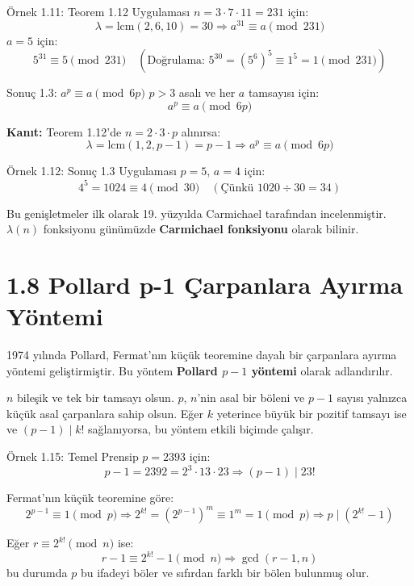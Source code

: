 \documentclass[12pt]{article}
\begin{document}
\begin{examplebox}{Örnek 1.11: Teorem 1.12 Uygulaması}
$n = 3 \cdot 7 \cdot 11 = 231$ için:
\[
\lambda = \text{lcm}(2,6,10) = 30 \Rightarrow a^{31} \equiv a \pmod{231}
\]
$a = 5$ için:
\[
5^{31} \equiv 5 \pmod{231} \quad (\text{Doğrulama: } 5^{30} = (5^6)^5 \equiv 1^5 = 1 \pmod{231})
\]
\end{examplebox}

\begin{theorembox}{Sonuç 1.3: $a^p \equiv a \pmod{6p}$}
$p > 3$ asalı ve her $a$ tamsayısı için:
\[
a^p \equiv a \pmod{6p}
\]

\textbf{Kanıt:} Teorem 1.12'de $n = 2 \cdot 3 \cdot p$ alınırsa:
\[
\lambda = \text{lcm}(1,2,p-1) = p-1 \Rightarrow a^p \equiv a \pmod{6p}
\]
\end{theorembox}

\begin{examplebox}{Örnek 1.12: Sonuç 1.3 Uygulaması}
$p = 5$, $a = 4$ için:
\[
4^5 = 1024 \equiv 4 \pmod{30} \quad (\text{Çünkü } 1020 \div 30 = 34)
\]
\end{examplebox}

\begin{tcolorbox}[colback=gray!10, colframe=black, title={Tarihsel Not}]
Bu genişletmeler ilk olarak 19. yüzyılda Carmichael tarafından incelenmiştir. $\lambda(n)$ fonksiyonu günümüzde \textbf{Carmichael fonksiyonu} olarak bilinir.
\end{tcolorbox}

\section*{1.8 Pollard p-1 Çarpanlara Ayırma Yöntemi}

1974 yılında Pollard, Fermat'nın küçük teoremine dayalı bir çarpanlara ayırma yöntemi geliştirmiştir. Bu yöntem \textbf{Pollard $p - 1$ yöntemi} olarak adlandırılır.

$n$ bileşik ve tek bir tamsayı olsun. $p$, $n$'nin asal bir böleni ve $p - 1$ sayısı yalnızca küçük asal çarpanlara sahip olsun. Eğer $k$ yeterince büyük bir pozitif tamsayı ise ve $(p - 1) \mid k!$ sağlanıyorsa, bu yöntem etkili biçimde çalışır.

\begin{examplebox}{Örnek 1.15: Temel Prensip}
$p = 2393$ için:
\[
p - 1 = 2392 = 2^3 \cdot 13 \cdot 23 \Rightarrow (p - 1) \mid 23!
\]

Fermat'nın küçük teoremine göre:
\[
2^{p - 1} \equiv 1 \pmod{p} \Rightarrow 2^{k!} = (2^{p - 1})^m \equiv 1^m = 1 \pmod{p}
\Rightarrow p \mid (2^{k!} - 1)
\]

Eğer $r \equiv 2^{k!} \pmod{n}$ ise:
\[
r - 1 \equiv 2^{k!} - 1 \pmod{n}
\Rightarrow \gcd(r - 1, n)
\]
bu durumda $p$ bu ifadeyi böler ve sıfırdan farklı bir bölen bulunmuş olur.
\end{examplebox}
\end{document}
